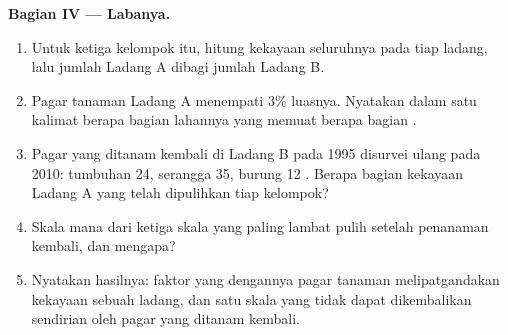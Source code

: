 \begin{problem}
\medskip
\noindent\textbf{Bagian IV --- Labanya.}
\begin{enumerate}[resume]
  \item Untuk ketiga kelompok itu, hitung kekayaan  seluruhnya
        pada tiap ladang, lalu jumlah Ladang A dibagi jumlah Ladang B.
  \item Pagar tanaman Ladang A menempati 3\% luasnya. Nyatakan dalam
        satu kalimat berapa bagian lahannya yang memuat berapa bagian
        .
  \item Pagar yang ditanam kembali di Ladang B pada 1995 disurvei ulang
        pada 2010: tumbuhan 24, serangga 35, burung 12 . Berapa
        bagian kekayaan Ladang A yang telah dipulihkan tiap kelompok?
  \item Skala mana dari ketiga skala  yang paling
        lambat pulih setelah penanaman kembali, dan mengapa?
  \item Nyatakan hasilnya: faktor yang dengannya pagar tanaman
        melipatgandakan kekayaan  sebuah ladang, dan satu skala
         yang tidak dapat dikembalikan sendirian
        oleh pagar yang ditanam kembali.
\end{enumerate}
\end{problem}
